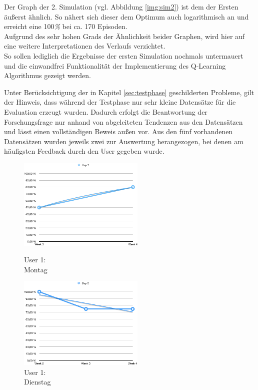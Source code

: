 Der Graph der 2. Simulation (vgl. Abbildung \ref{img:sim2}) ist dem der Ersten äußerst ähnlich. So nähert sich dieser dem Optimum auch logarithmisch an und erreicht eine 100\textit{\%}  bei ca. 170 Episoden.\\
Aufgrund des sehr hohen Grads der Ähnlichkeit beider Graphen, wird hier auf eine weitere Interpretationen des Verlaufs verzichtet. \\
So sollen lediglich die Ergebnisse der ersten Simulation nochmals untermauert und die einwandfrei Funktionalität der Implementierung des Q-Learning Algorithmus gezeigt werden. 

Unter Berücksichtigung der in Kapitel \ref{sec:testphase} geschilderten Probleme, gilt der Hinweis, dass während der Testphase nur sehr kleine Datensätze für die Evaluation erzeugt wurden. Dadurch erfolgt die Beantwortung der Forschungsfrage nur anhand von abgeleiteten Tendenzen aus den Datensätzen und lässt einen vollständigen Beweis außen vor. Aus den fünf vorhandenen Datensätzen wurden jeweils zwei zur Auswertung herangezogen, bei denen am häufigsten Feedback durch den User gegeben wurde.

\begin{figure}[t!]
    \centering
    \parbox{6cm}{
    \includegraphics[width=6cm]{./Abbildungen/Kapitel_04/usr1day1.png}
    \caption{User 1: \\Montag}
    \label{img:usr1day1}}
    \qquad
    \begin{minipage}{6cm}
    \includegraphics[width=6cm]{./Abbildungen/Kapitel_04/usr1day2.png}
    \caption{User 1: \\Dienstag}
    \label{img:usr1day2}
    \end{minipage}
\end{figure}


